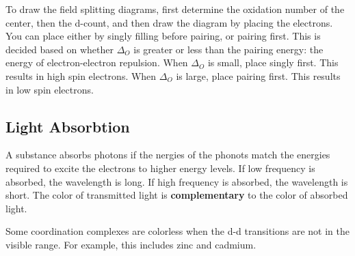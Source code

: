 \documentclass{article}
\begin{document}
To draw the field splitting diagrams, first determine the oxidation number of
the center, then the d-count, and then draw the diagram by placing the
electrons. You can place either by singly filling before pairing, or pairing
first. This is decided based on whether $\Delta_{O}$ is greater or less than the
pairing energy: the energy of electron-electron repulsion. When $\Delta_{O}$ is
small, place singly first. This results in high spin electrons. When
$\Delta_{O}$ is large, place pairing first. This results in low spin electrons.

\subsection{ Light Absorbtion }

A substance absorbs photons if the nergies of the phonots match the energies
required to excite the electrons to higher energy levels. If low frequency is
absorbed, the wavelength is long. If high frequency is absorbed, the wavelength
is short. The color of transmitted light is \textbf{complementary} to the color
of absorbed light. 

Some coordination complexes are colorless when the d-d transitions are not in
the visible range. For example, this includes zinc and cadmium. 
\end{document}
